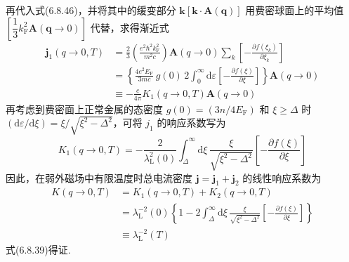 再代入式(6.8.46)，并将其中的缓变部分
$\boldsymbol{k}\left[\boldsymbol{k}\cdot\boldsymbol{A}(\boldsymbol{q})\right]$
用费密球面上的平均值 $\left[\dfrac{1}{3}k_{\mathrm{F}}^{2}
\boldsymbol{A}(\boldsymbol{q}\to0)\right]$ 代替，求得渐近式
\begin{equation}
\begin{aligned}
  \boldsymbol{j}_{1}(q\to0,T)
  &=\frac{2}{3}\left(\frac{e^{2}\hbar^{2}k_{\mathrm{F}}^{2}}{m^{2}c}\right)
  \boldsymbol{A}(q\to0)\sum_{k}
  \left[-\frac{\partial f(\xi_{k})}{\partial\xi_{k}}\right]\\
  &=\left\{\frac{4e^{2}E_{\mathrm{F}}}{3mc}\,g(0)\,2
  \int_{0}^{\infty}\mathrm{d}\varepsilon
  \left[-\frac{\partial f(\xi)}{\partial\xi}\right]\right\}
  \boldsymbol{A}(q\to0)\\
  &\equiv-\frac{c}{4\pi}K_{1}(q\to0,T)\boldsymbol{A}(q\to0)
\end{aligned}
\end{equation}
再考虑到费密面上正常金属的态密度 $g(0)=\left(3n/4E_{\mathrm{F}}\right)$ 和 $\xi\geqslant\Delta$ 时 $\left(\mathrm{d}\varepsilon/\mathrm{d}\xi\right)
=\xi/\sqrt{\xi^{2}-\Delta^{2}}$，可将 $j_{1}$ 的响应系数写为
\begin{equation}
  K_{1}(q\to0,T)=-\frac{2}{\lambda_{\mathrm{L}}^{2}(0)}
  \int_{\Delta}^{\infty}\mathrm{d}\xi\,
  \frac{\xi}{\sqrt{\xi^{2}-\Delta^{2}}}
  \left[-\frac{\partial f(\xi)}{\partial\xi}\right]
\end{equation}
因此，在弱外磁场中有限温度时总电流密度 $\boldsymbol{j}=\boldsymbol{j}_{1}+\boldsymbol{j}_{2}$ 的线性响应系数为
\begin{equation*}
\begin{aligned}
  K(q\to0,T)&=K_{1}(q\to0,T)+K_{2}(q\to0,T)\\
  &=\lambda_{\mathrm{L}}^{-2}(0)\left\{1-2\int_{\Delta}^{\infty}
  \mathrm{d}\xi\,\frac{\xi}{\sqrt{\xi^{2}-\Delta^{2}}}
  \left[-\frac{\partial f(\xi)}{\partial\xi}\right]\right\}\\
  &\equiv\lambda_{\mathrm{L}}^{-2}(T)
\end{aligned}
\end{equation*}
式(6.8.39)得证.

